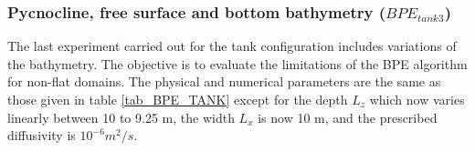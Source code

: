 
\subsubsection{Pycnocline, free surface and bottom bathymetry ($BPE_{tank3}$)}
The last experiment carried out for the tank configuration includes variations of the bathymetry. The objective is to evaluate the limitations of the BPE algorithm for non-flat domains. The physical and numerical parameters are the same as those given in table \ref{tab_BPE_TANK} except for the depth $L_z$ which now varies linearly between 10 to 9.25 m, the width $L_x$ is now 10 m, and the prescribed diffusivity is $10^{-6}m^2/s$.%

